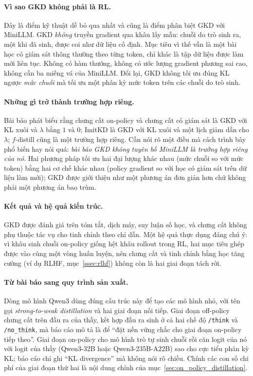 \paragraph{Vì sao GKD không phải là RL.} Đây là điểm kỹ thuật dễ bỏ qua nhất và cũng là điểm phân biệt GKD với MiniLLM. GKD \emph{không} truyền gradient qua khâu lấy mẫu: chuỗi do trò sinh ra, một khi đã sinh, được coi như dữ liệu cố định. Mục tiêu vì thế vẫn là một bài học có giám sát thông thường theo từng token, chỉ khác là tập dữ liệu được làm mới liên tục. Không có hàm thưởng, không có ước lượng gradient phương sai cao, không cần ba miếng vá của MiniLLM. Đổi lại, GKD không tối ưu đúng KL ngược \emph{mức chuỗi} mà tối ưu một phân kỳ mức token trên các chuỗi do trò sinh.

\paragraph{Những gì trở thành trường hợp riêng.} Bài báo phát biểu rằng chưng cất on-policy và chưng cất có giám sát là GKD với KL xuôi và $\lambda$ bằng $1$ và $0$; ImitKD là GKD với KL xuôi và một lịch giảm dần cho $\lambda$; $f$-distill cũng là một trường hợp riêng. Cần nói rõ một điều mà cách trình bày phổ biến hay nói quá: \emph{bài báo GKD không tuyên bố MiniLLM là trường hợp riêng của nó}. Hai phương pháp tối ưu hai đại lượng khác nhau (mức chuỗi so với mức token) bằng hai cơ chế khác nhau (policy gradient so với học có giám sát trên dữ liệu làm mới); GKD được giới thiệu như một phương án đơn giản hơn chứ không phải một phương án bao trùm.

\paragraph{Kết quả và hệ quả kiến trúc.} GKD được đánh giá trên tóm tắt, dịch máy, suy luận số học, và chưng cất không phụ thuộc tác vụ cho tinh chỉnh theo chỉ dẫn. Một hệ quả thực dụng đáng chú ý: vì khâu sinh chuỗi on-policy giống hệt khâu rollout trong RL, hai mục tiêu ghép được vào cùng một vòng huấn luyện, nên chưng cất và tinh chỉnh bằng học tăng cường (ví dụ RLHF, mục~\ref{ssec:rlhf}) không còn là hai giai đoạn tách rời.

\paragraph{Từ bài báo sang quy trình sản xuất.} Dòng mô hình Qwen3 \cite{yang2025qwen3} dùng đúng cấu trúc này để tạo các mô hình nhỏ, với tên gọi \emph{strong-to-weak distillation} và hai giai đoạn nối tiếp. Giai đoạn off-policy chưng cất trên đầu ra của thầy, kết hợp đầu ra sinh ở cả hai chế độ \texttt{/think} và \texttt{/no\_think}, mà báo cáo mô tả là để ``đặt nền vững chắc cho giai đoạn on-policy tiếp theo''. Giai đoạn on-policy cho mô hình trò tự sinh chuỗi rồi căn logit của nó với logit của thầy (Qwen3-32B hoặc Qwen3-235B-A22B) sao cho cực tiểu phân kỳ KL; báo cáo chỉ ghi ``KL divergence'' mà không nói rõ chiều. Chính các con số chi phí của giai đoạn thứ hai là nội dung chính của mục~\ref{sec:on_policy_distillation}.

